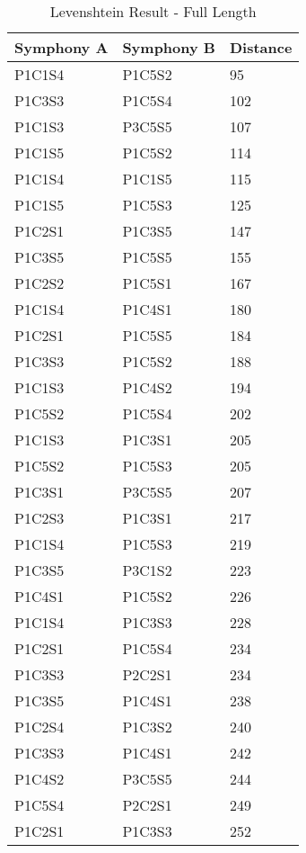 \begin{longtable}{|l|l|l|}
\caption{Levenshtein Result - Full Length}
\label{my-label}\\
\hline
Symphony A & Symphony B & Distance \\ \hline
\endfirsthead
%
\endhead
%
P1C1S4 & P1C5S2 & 95 \\ \hline
P1C3S3 & P1C5S4 & 102 \\ \hline
P1C1S3 & P3C5S5 & 107 \\ \hline
P1C1S5 & P1C5S2 & 114 \\ \hline
P1C1S4 & P1C1S5 & 115 \\ \hline
P1C1S5 & P1C5S3 & 125 \\ \hline
P1C2S1 & P1C3S5 & 147 \\ \hline
P1C3S5 & P1C5S5 & 155 \\ \hline
P1C2S2 & P1C5S1 & 167 \\ \hline
P1C1S4 & P1C4S1 & 180 \\ \hline
P1C2S1 & P1C5S5 & 184 \\ \hline
P1C3S3 & P1C5S2 & 188 \\ \hline
P1C1S3 & P1C4S2 & 194 \\ \hline
P1C5S2 & P1C5S4 & 202 \\ \hline
P1C1S3 & P1C3S1 & 205 \\ \hline
P1C5S2 & P1C5S3 & 205 \\ \hline
P1C3S1 & P3C5S5 & 207 \\ \hline
P1C2S3 & P1C3S1 & 217 \\ \hline
P1C1S4 & P1C5S3 & 219 \\ \hline
P1C3S5 & P3C1S2 & 223 \\ \hline
P1C4S1 & P1C5S2 & 226 \\ \hline
P1C1S4 & P1C3S3 & 228 \\ \hline
P1C2S1 & P1C5S4 & 234 \\ \hline
P1C3S3 & P2C2S1 & 234 \\ \hline
P1C3S5 & P1C4S1 & 238 \\ \hline
P1C2S4 & P1C3S2 & 240 \\ \hline
P1C3S3 & P1C4S1 & 242 \\ \hline
P1C4S2 & P3C5S5 & 244 \\ \hline
P1C5S4 & P2C2S1 & 249 \\ \hline
P1C2S1 & P1C3S3 & 252 \\ \hline
\end{longtable}

